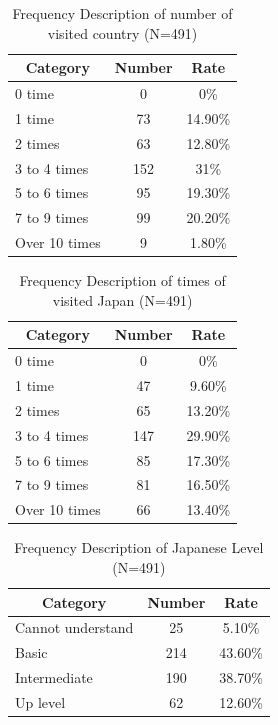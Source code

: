 \begin{table}[h]
  \caption[Frequency Description of number of visited country ]{Frequency Description of number of visited country (N=491)}
  \label{table28d}
  \centering
  \begin{tabular}{l|cc}
 \hline
\multicolumn{1}{c|}{Category}&Number&Rate\\
 \hline
0 time        & 0                    & 0\%                  \\
1 time        & 73                   & 14.90\%              \\
2 times       & 63                   & 12.80\%              \\
3 to 4 times  & 152                  & 31\%                 \\
5 to 6 times  & 95                   & 19.30\%              \\
7 to 9 times  & 99                   & 20.20\%              \\
Over 10 times & 9                    & 1.80\%               \\
 \hline
  \end{tabular}
\end{table}

\begin{table}[h]
  \caption[Frequency Description of times of visited Japan]{Frequency Description of times of visited Japan (N=491)}
  \label{table28e}
  \centering
  \begin{tabular}{l|cc}
 \hline
\multicolumn{1}{c|}{Category}&Number&Rate\\
 \hline
0 time        & 0   & 0\%     \\
1 time        & 47  & 9.60\%  \\
2 times       & 65  & 13.20\% \\
3 to 4 times  & 147 & 29.90\% \\
5 to 6 times  & 85  & 17.30\% \\
7 to 9 times  & 81  & 16.50\% \\
Over 10 times & 66  & 13.40\% \\
 \hline
  \end{tabular}
\end{table}

\begin{table}[h]
  \caption[Frequency Description of Japanese Level]{Frequency Description of Japanese Level (N=491)}
  \label{table28f}
  \centering
  \begin{tabular}{l|cc}
 \hline
\multicolumn{1}{c|}{Category}&Number&Rate\\
 \hline
Cannot understand                    & 25  & 5.10\%  \\
Basic        & 214 & 43.60\% \\
Intermediate & 190 & 38.70\% \\
Up level     & 62  & 12.60\% \\
 \hline
  \end{tabular}
\end{table}

